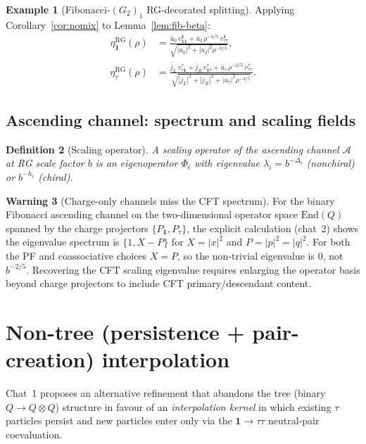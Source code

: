 \documentclass[11pt,a4paper]{article}
\newtheorem{definition}{Definition}[section]
\theoremstyle{definition}
\newtheorem{warning}[definition]{Warning}
\newtheorem{example}[definition]{Example}
\newcommand{\Aa}{\mathcal{A}}
\newcommand{\End}{\mathrm{End}}
\newcommand{\one}{\mathbf{1}}
\begin{document}
\begin{example}[Fibonacci-$(G_2)_1$ RG-decorated splitting]\label{ex:fib-RG}
Applying Corollary~\ref{cor:nomix} to Lemma~\ref{lem:fib-beta}:
\begin{align*}
\eta_{\one}^{\mathrm{RG}}(\rho)
&= \frac{\bar u_0\,v^{\one}_{\one\one} + \bar u_I\,\rho^{-4/5}\,v^{\one}_{\tau\tau}}
       {\sqrt{|u_0|^{2}+|u_I|^{2}\rho^{-8/5}}},\\
\eta_{\tau}^{\mathrm{RG}}(\rho)
&= \frac{\bar j_L\,v^{\tau}_{\tau\one} + \bar j_R\,v^{\tau}_{\one\tau} + \bar u_\tau\,\rho^{-2/5}\,v^{\tau}_{\tau\tau}}
       {\sqrt{|j_L|^{2}+|j_R|^{2}+|u_\tau|^{2}\rho^{-4/5}}}.
\end{align*}
\end{example}

\subsection{Ascending channel: spectrum and scaling fields}

\begin{definition}[Scaling operator]\label{def:scalop}
A \emph{scaling operator} of the ascending channel $\Aa$ at RG scale factor
$b$ is an eigenoperator $\Phi_i$ with eigenvalue $\lambda_i = b^{-\Delta_i}$
(nonchiral) or $b^{-h_i}$ (chiral).
\end{definition}

\begin{warning}[Charge-only channels miss the CFT spectrum]\label{warn:charge-only}
For the binary Fibonacci ascending channel on the two-dimensional operator
space $\End(Q)$ spanned by the charge projectors $\{P_\one,P_\tau\}$, the
explicit calculation (chat~2) shows the eigenvalue spectrum is
$\{1, X-P\}$ for $X=|x|^{2}$ and $P=|p|^{2}=|q|^{2}$. For both the PF and
coassociative choices $X=P$, so the non-trivial eigenvalue is $0$, not
$b^{-2/5}$. Recovering the CFT scaling eigenvalue requires enlarging the
operator basis beyond charge projectors to include CFT primary/descendant
content.
\end{warning}

\section{Non-tree (persistence + pair-creation) interpolation}\label{sec:non-tree}

Chat~1 proposes an alternative refinement that abandons the tree (binary
$Q\to Q\otimes Q$) structure in favour of an \emph{interpolation kernel} in
which existing $\tau$ particles persist and new particles enter only via the
$\one\to\tau\tau$ neutral-pair coevaluation.
\end{document}
